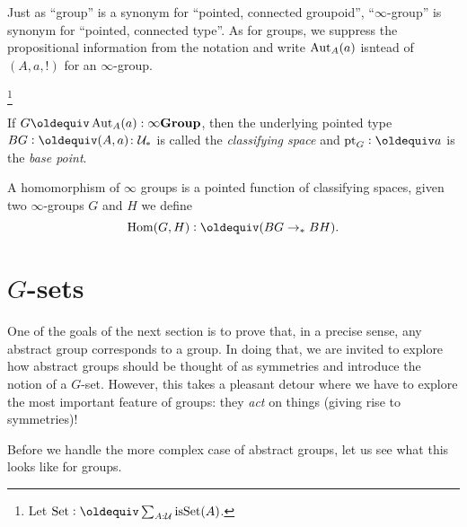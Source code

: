 \begin{remark}\label{rem:pointedtypes}
  Just as ``group'' is a synonym for ``pointed, connected groupoid'', ``$\infty$-group'' is synonym for ``pointed, connected type''.  As for groups, we suppress the propositional information from the notation and write $\mathrm{Aut}_A(a)$ isntead of $(A,a,!)$ for an $\infty$-group.
\end{remark}


\footnote{Let $\typeset\defequi \sum_{A:\UU}\isset(A)$.}
\begin{definition}\label{def:classifyingspace}
  If $G\oldequiv\Aut_A(a):\typeinftygp$, then the underlying pointed type $BG\defequi (A,a)\colon\pttype$ is called the  \emph{classifying space} and $\pt_G\defequi a$ is the \emph{base point}.  
\end{definition}
\begin{definition}
  A homomorphism of $\infty$ groups is a pointed function of classifying spaces, \ie
  given two $\infty$-groups $G$ and $H$ we define
$$\Hom(G,H)\defequi(BG\to_*BH).$$
\end{definition}





\section{$G$-sets}
\label{sec:gsets}

One of the goals of the next section is to prove that, in a precise sense, any abstract group corresponds to a group.  In doing that, we are invited to explore how abstract groups should be thought of as symmetries and introduce the notion of a $G$-set.  However, this takes a pleasant detour where we have to explore the most important feature of groups: they \emph{act} on things (giving rise to symmetries)!

Before we handle the more complex case of abstract groups, let us see what this looks like for groups.

